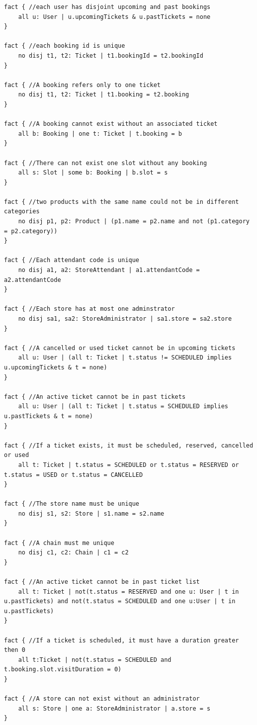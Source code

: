 \documentclass[table, 12pt]{article}
\begin{document}
\begin{flushleft}
\begin{lstlisting}[language=alloy]
fact { //each user has disjoint upcoming and past bookings
	all u: User | u.upcomingTickets & u.pastTickets = none
}

fact { //each booking id is unique
	no disj t1, t2: Ticket | t1.bookingId = t2.bookingId
}

fact { //A booking refers only to one ticket
	no disj t1, t2: Ticket | t1.booking = t2.booking
}

fact { //A booking cannot exist without an associated ticket
	all b: Booking | one t: Ticket | t.booking = b
}

fact { //There can not exist one slot without any booking
	all s: Slot | some b: Booking | b.slot = s
}

fact { //two products with the same name could not be in different categories
	no disj p1, p2: Product | (p1.name = p2.name and not (p1.category = p2.category))
}

fact { //Each attendant code is unique
	no disj a1, a2: StoreAttendant | a1.attendantCode = a2.attendantCode
}

fact { //Each store has at most one adminstrator
	no disj sa1, sa2: StoreAdministrator | sa1.store = sa2.store
}

fact { //A cancelled or used ticket cannot be in upcoming tickets
	all u: User | (all t: Ticket | t.status != SCHEDULED implies u.upcomingTickets & t = none)
}

fact { //An active ticket cannot be in past tickets
	all u: User | (all t: Ticket | t.status = SCHEDULED implies u.pastTickets & t = none)
}

fact { //If a ticket exists, it must be scheduled, reserved, cancelled or used
	all t: Ticket | t.status = SCHEDULED or t.status = RESERVED or t.status = USED or t.status = CANCELLED
}

fact { //The store name must be unique
	no disj s1, s2: Store | s1.name = s2.name
}

fact { //A chain must me unique
	no disj c1, c2: Chain | c1 = c2
}

fact { //An active ticket cannot be in past ticket list
	all t: Ticket | not(t.status = RESERVED and one u: User | t in u.pastTickets) and not(t.status = SCHEDULED and one u:User | t in u.pastTickets)
}

fact { //If a ticket is scheduled, it must have a duration greater then 0
	all t:Ticket | not(t.status = SCHEDULED and t.booking.slot.visitDuration = 0)
}

fact { //A store can not exist without an administrator
	all s: Store | one a: StoreAdministrator | a.store = s
}


\end{lstlisting}
\end{flushleft}
\end{document}
